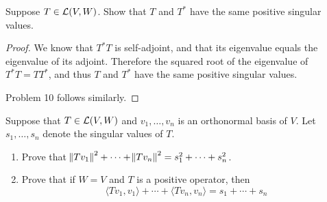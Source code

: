 \documentclass{extarticle}
\begin{document}



\begin{problem}{9}
    Suppose \(T \in \mathcal{L}(V, W)\). Show that \(T\) and \(T^*\) have the same positive singular 
    values.
\end{problem}

\begin{proof}
We know that \(T^*T\) is self-adjoint, and that its eigenvalue equals the eigenvalue of its adjoint. 
Therefore the squared root of the eigenvalue of \(T^*T = TT^*\), and thus \(T\) and \(T^*\) have 
the same positive singular values.

Problem 10 follows similarly. 
\end{proof}

\begin{problem}{11}
    Suppose that \(T \in \mathcal{L}(V, W)\) and \(v_1, \ldots, v_n\) is an orthonormal basis of \(V\). 
    Let \(s_1, \ldots, s_n\) denote the singular values of \(T\). 
    \begin{enumerate}[label=(\alph*)]
        \item Prove that \(\norm{Tv_1}^2 + \cdots + \norm{Tv_n}^2 = s_1^2 + \cdots + s_n^2\). 
        \item Prove that if \(W = V\) and \(T\) is a positive operator, then 
        \[\langle Tv_1,v_1 \rangle + \cdots + \langle Tv_n,v_n \rangle = s_1 + \cdots + s_n\]
    \end{enumerate}
\end{problem}
\end{document}
